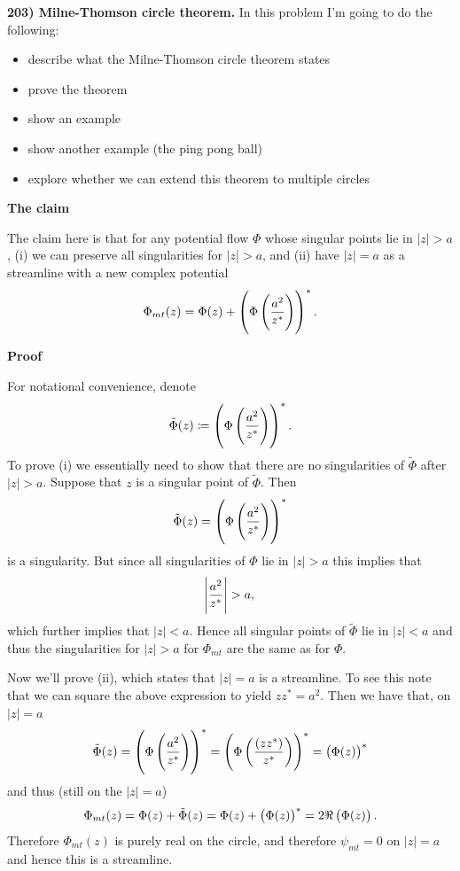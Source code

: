 \documentclass{article}
\def\ti#1{\tilde{#1}}
\begin{document}
\newpage

\textbf{203) Milne-Thomson circle theorem.}
In this problem I'm going to do the following:
%
\begin{itemize}
    \item describe what the Milne-Thomson circle theorem states
    \item prove the theorem
    \item show an example
    \item show another example (the ping pong ball)
    \item explore whether we can extend this theorem to multiple circles
\end{itemize}

\textbf{The claim}

The claim here is that for any potential flow $\Phi$ whose singular
points lie in $|z| > a$, (i) we can preserve all singularities for $|z|
> a$, and (ii) have $|z| = a$ as a streamline with a new complex
potential
%
\begin{equation*}
    \Phi_{mt}(z) = \Phi(z) + \del{\Phi \del{\frac{a^2}{z^*}}}^*
    .
\end{equation*}

\textbf{Proof}

For notational convenience, denote
%
\begin{equation*}
    \ti{\Phi}(z) \coloneqq \del{\Phi \del{\frac{a^2}{z^*}}}^*
    .
\end{equation*}
%
To prove (i) we essentially need to show that there are no singularities
of $\ti\Phi$ after $|z| > a$. Suppose that $z$ is a singular point of
$\ti\Phi$. Then
%
\begin{equation*}
    \ti\Phi(z) = \del{\Phi \del{\frac{a^2}{z^*}}}^*
\end{equation*}
%
is a singularity. But since all singularities of $\Phi$ lie in $|z| >
a$ this implies that
%
\begin{equation*}
    \envert{\frac{a^2}{z^*}} > a
    ,
\end{equation*}
%
which further implies that $|z| < a$. Hence all singular points of
$\ti\Phi$ lie in $|z| < a$ and thus the singularities for $|z| > a$ for
$\Phi_{mt}$ are the same as for $\Phi$.

Now we'll prove (ii), which states that $|z| = a$ is a streamline. To
see this note that we can square the above expression to yield $z z^* =
a^2$. Then we have that, on $|z| = a$
%
\begin{equation*}
    \ti\Phi(z)
        = \del{\Phi \del{\frac{a^2}{z^*}}}^*
        = \del{\Phi \del{\frac{(z z^*)}{z^*}}}^*
        = \del{\Phi(z)}^*
\end{equation*}
%
and thus (still on the $|z| = a$)
%
\begin{equation*}
    \Phi_{mt}(z) = \Phi(z) + \ti\Phi(z) = \Phi(z) + \del{\Phi(z)}^* = 2 \Re\del{\Phi(z)}
    .
\end{equation*}
%
Therefore $\Phi_{mt}(z)$ is purely real on the circle, and therefore
$\psi_{mt} = 0$ on $|z| = a$ and hence this is a streamline.
\end{document}
